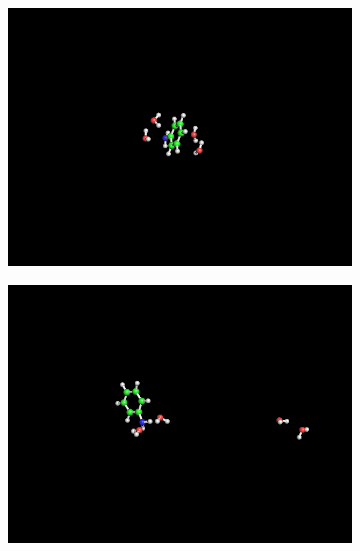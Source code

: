 \documentclass[
journal=jpcbfk, %
manuscript=article]{achemso}
\begin{document}
\begin{figure}[!tbp]
	\centering
	\label{fig:aniline4}
	\begin{subfigure}[b]{0.4\textwidth}
		\includegraphics[width=1\textwidth]{wB97XD/aniline4_0fs.png}
		\caption{}
		\label{fig:aniline4a))}
	\end{subfigure}
	\hfill
	\begin{subfigure}[b]{0.4\textwidth}
		\includegraphics[width=1\textwidth]{wB97XD/aniline4_1500fs.png}
		\caption{}
		\label{fig:aniline4b)}
	\end{subfigure}
	

\end{figure}
\end{document}
